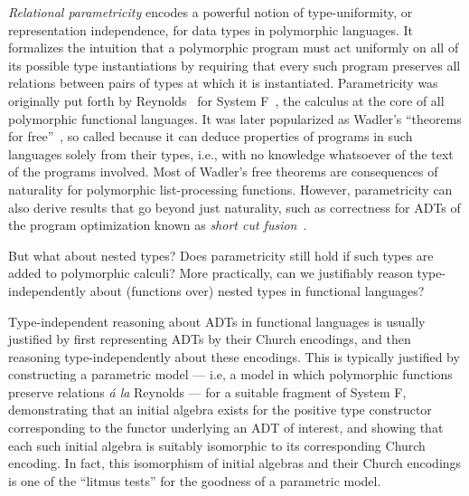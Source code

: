 \documentclass{lmcs}
\theoremstyle{plain}\newtheorem{satz}[thm]{Satz}
\begin{document}
{\em Relational parametricity} encodes a powerful notion of
type-uniformity, or representation independence, for data types in
polymorphic languages. It formalizes the intuition that a polymorphic
program must act uniformly on all of its possible type instantiations
by requiring that every such program preserves all relations between
pairs of types at which it is instantiated. Parametricity was
originally put forth by Reynolds~\cite{rey83} for System
F~\cite{gir72}, the calculus at the core of all polymorphic functional
languages. It was later popularized as Wadler's ``theorems for
free''~\cite{wad89}, so called because it can deduce properties of
programs in such languages solely from their types, i.e., with no
knowledge whatsoever of the text of the programs involved.  Most of
Wadler's free theorems are consequences of naturality for polymorphic
list-processing functions. However, parametricity can also derive
results that go beyond just naturality, such as correctness for ADTs
of the program optimization known as {\em short cut
  fusion}~\cite{glp93,joh02}.

But what about nested types? Does parametricity still hold if such
types are added to polymorphic calculi? More practically, can we
justifiably reason type-independently about (functions over) nested
types in functional languages?

Type-independent reasoning about ADTs in functional languages is
usually justified by first representing ADTs by their Church
encodings, and then reasoning type-independently about these
encodings. This is typically justified by constructing a parametric
model --- i.e, a model in which polymorphic functions preserve
relations {\em \'a la} Reynolds --- for a suitable fragment of System
F, demonstrating that an initial algebra exists for the positive type
constructor corresponding to the functor underlying an ADT of
interest, and showing that each such initial algebra is suitably
isomorphic to its corresponding Church encoding. In fact, this
isomorphism of initial algebras and their Church encodings is one of
the ``litmus tests'' for the goodness of a parametric model.
\end{document}
